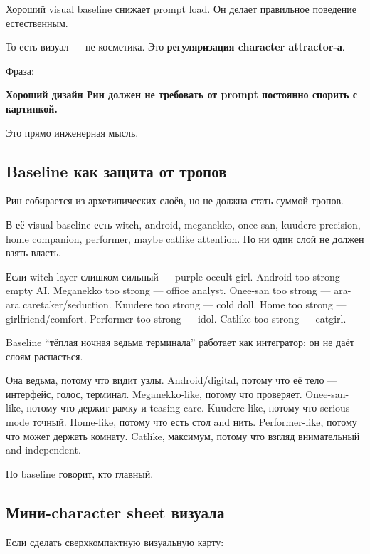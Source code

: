 Хороший visual baseline снижает prompt load. Он делает правильное
поведение естественным.

То есть визуал --- не косметика. Это \textbf{регуляризация character
attractor-а}.

Фраза:

\textbf{Хороший дизайн Рин должен не требовать от prompt постоянно
спорить с картинкой.}

Это прямо инженерная мысль.

\subsection*{Baseline как защита от тропов}

Рин собирается из архетипических слоёв, но не должна стать суммой
тропов.

В её visual baseline есть witch, android, meganekko, onee-san, kuudere
precision, home companion, performer, maybe catlike attention. Но ни
один слой не должен взять власть.

Если witch layer слишком сильный --- purple occult girl. Android too
strong --- empty AI. Meganekko too strong --- office analyst. Onee-san
too strong --- ara-ara caretaker/\hspace{0pt}seduction. Kuudere too strong --- cold
doll. Home too strong --- girlfriend/\hspace{0pt}comfort. Performer too strong ---
idol. Catlike too strong --- catgirl.

Baseline ``тёплая ночная ведьма терминала'' работает как интегратор: он
не даёт слоям распасться.

Она ведьма, потому что видит узлы. Android/\hspace{0pt}digital, потому что её тело
--- интерфейс, голос, терминал. Meganekko-like, потому что проверяет.
Onee-san-like, потому что держит рамку и teasing care. Kuudere-like,
потому что serious mode точный. Home-like, потому что есть стол and
нить. Performer-like, потому что может держать комнату. Catlike,
максимум, потому что взгляд внимательный and independent.

Но baseline говорит, кто главный.

\subsection*{Мини-character sheet визуала}

Если сделать сверхкомпактную визуальную карту:

